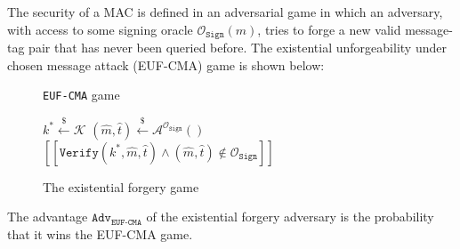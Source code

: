 \documentclass[journal=tches,submission]{iacrtrans}
\newcommand{\sign}{\texttt{Sign}}
\newcommand{\verify}{\texttt{Verify}}
\newcommand{\leftsample}{\stackrel{\$}{\leftarrow}}
\newcommand{\llbrack}{[\![}
\newcommand{\rrbrack}{]\!]}
\newcommand{\adv}{\texttt{Adv}}
\begin{document}
The security of a MAC is defined in an adversarial game in which an adversary, with access to some signing oracle $\mathcal{O}_\sign(m)$, tries to forge a new valid message-tag pair that has never been queried before. The existential unforgeability under chosen message attack (EUF-CMA) game is shown below:

\begin{figure}[H]
    \centering
    \begin{minipage}{0.7\textwidth}
        \begin{algorithm}[H]
            \caption*{\texttt{EUF-CMA} game}

            \begin{algorithmic}[1]
                \State $k^\ast \leftsample \mathcal{K}$
                \State $(\hat{m}, \hat{t}) \leftsample \mathcal{A}^{\mathcal{O}_\sign}()$
                \State \Return $
                    \llbrack \verify(k^\ast, \hat{m}, \hat{t}) 
                    \land (\hat{m}, \hat{t}) \not\in \mathcal{O}_\sign
                    \rrbrack
                $
            \end{algorithmic}
        \end{algorithm}
    \end{minipage}
    \caption{The existential forgery game}\label{fig:euf-cma-game}
\end{figure}

The advantage $\adv_\texttt{EUF-CMA}$ of the existential forgery adversary is the probability that it wins the EUF-CMA game.
\end{document}
